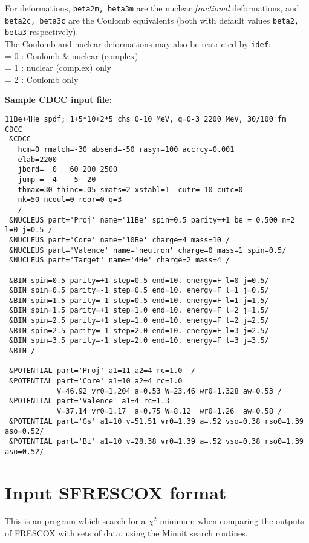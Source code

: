 \documentclass[11pt]{article}
\begin{document}
For deformations, {\tt beta2m, beta3m} are the nuclear {\em fractional}
deformations, and {\tt beta2c, beta3c} are the Coulomb equivalents (both with default
values  {\tt beta2, beta3} respectively).\\
The Coulomb and nuclear deformations may also be restricted by {\tt idef}:
\\   = 0 : Coulomb \& nuclear (complex)
\\  = 1 : nuclear (complex) only
\\  = 2 : Coulomb only


{\bf Sample CDCC input file:}
\begin{verbatim}
11Be+4He spdf; 1+5*10+2*5 chs 0-10 MeV, q=0-3 2200 MeV, 30/100 fm
CDCC
 &CDCC
   hcm=0 rmatch=-30 absend=-50 rasym=100 accrcy=0.001
   elab=2200
   jbord=  0   60 200 2500
   jump =  4    5  20
   thmax=30 thinc=.05 smats=2 xstabl=1  cutr=-10 cutc=0
   nk=50 ncoul=0 reor=0 q=3
   /
 &NUCLEUS part='Proj' name='11Be' spin=0.5 parity=+1 be = 0.500 n=2 l=0 j=0.5 /
 &NUCLEUS part='Core' name='10Be' charge=4 mass=10 /
 &NUCLEUS part='Valence' name='neutron' charge=0 mass=1 spin=0.5/
 &NUCLEUS part='Target' name='4He' charge=2 mass=4 /

 &BIN spin=0.5 parity=+1 step=0.5 end=10. energy=F l=0 j=0.5/
 &BIN spin=0.5 parity=-1 step=0.5 end=10. energy=F l=1 j=0.5/
 &BIN spin=1.5 parity=-1 step=0.5 end=10. energy=F l=1 j=1.5/
 &BIN spin=1.5 parity=+1 step=1.0 end=10. energy=F l=2 j=1.5/
 &BIN spin=2.5 parity=+1 step=1.0 end=10. energy=F l=2 j=2.5/
 &BIN spin=2.5 parity=-1 step=2.0 end=10. energy=F l=3 j=2.5/
 &BIN spin=3.5 parity=-1 step=2.0 end=10. energy=F l=3 j=3.5/
 &BIN /

 &POTENTIAL part='Proj' a1=11 a2=4 rc=1.0  /
 &POTENTIAL part='Core' a1=10 a2=4 rc=1.0
            V=46.92 vr0=1.204 a=0.53 W=23.46 wr0=1.328 aw=0.53 /
 &POTENTIAL part='Valence' a1=4 rc=1.3
            V=37.14 vr0=1.17  a=0.75 W=8.12  wr0=1.26  aw=0.58 /
 &POTENTIAL part='Gs' a1=10 v=51.51 vr0=1.39 a=.52 vso=0.38 rso0=1.39 aso=0.52/
 &POTENTIAL part='Bi' a1=10 v=28.38 vr0=1.39 a=.52 vso=0.38 rso0=1.39 aso=0.52/
\end{verbatim}
\newpage
\section{Input SFRESCOX format}

This is an program which search for a $\chi^2$ minimum when comparing
the outputs of FRESCOX with sets of data, using the {\sc Minuit} search
routines.
\end{document}

